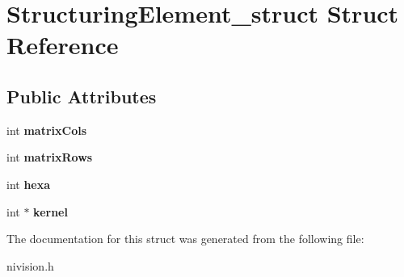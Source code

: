 \hypertarget{structStructuringElement__struct}{\section{\-Structuring\-Element\-\_\-struct \-Struct \-Reference}
\label{structStructuringElement__struct}
}
\subsection*{\-Public \-Attributes}
\begin{DoxyCompactItemize}
\item 
\hypertarget{structStructuringElement__struct_a2a1dfb5e78b8edf36937e7b2ca37db0c}{int {\bfseries matrix\-Cols}}\label{structStructuringElement__struct_a2a1dfb5e78b8edf36937e7b2ca37db0c}

\item 
\hypertarget{structStructuringElement__struct_a210809c7dc619889f7fe99866504ba05}{int {\bfseries matrix\-Rows}}\label{structStructuringElement__struct_a210809c7dc619889f7fe99866504ba05}

\item 
\hypertarget{structStructuringElement__struct_ad913f2140d6dacce145a54da29397ec3}{int {\bfseries hexa}}\label{structStructuringElement__struct_ad913f2140d6dacce145a54da29397ec3}

\item 
\hypertarget{structStructuringElement__struct_abdf639de105fa81786327fc096f222df}{int $\ast$ {\bfseries kernel}}\label{structStructuringElement__struct_abdf639de105fa81786327fc096f222df}

\end{DoxyCompactItemize}


\-The documentation for this struct was generated from the following file\-:\begin{DoxyCompactItemize}
\item 
nivision.\-h\end{DoxyCompactItemize}
